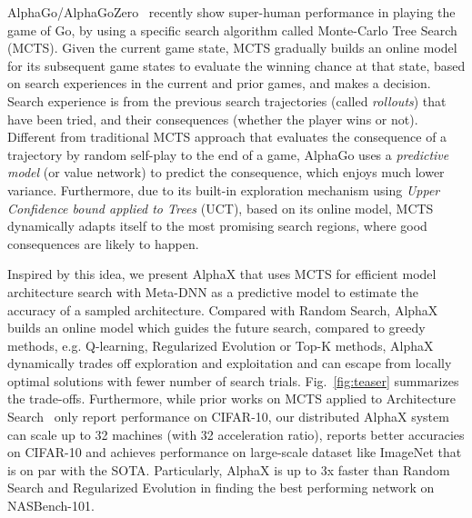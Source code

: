 \documentclass[10pt,twocolumn,letterpaper]{article}
\begin{document}
AlphaGo/AlphaGoZero~\cite{silver2016mastering} recently show super-human performance in playing the game of Go, by using a specific search algorithm called Monte-Carlo Tree Search (MCTS)\cite{kocsis2006bandit,browne2012survey}. Given the current game state, MCTS gradually builds an online model for its subsequent game states to evaluate the winning chance at that state, based on search experiences in the current and prior games, and makes a decision. Search experience is from the previous search trajectories (called \emph{rollouts}) that have been tried, and their consequences (whether the player wins or not). Different from traditional MCTS approach that evaluates the consequence of a trajectory by random self-play to the end of a game, AlphaGo uses a \emph{predictive model} (or value network) to predict the consequence, which enjoys much lower variance. Furthermore, due to its built-in exploration mechanism using \textit{Upper Confidence bound applied to Trees} (UCT)\cite{auer2002finite}, based on its online model, MCTS dynamically adapts itself to the most promising search regions, where good consequences are likely to happen.




Inspired by this idea, we present AlphaX that uses MCTS for efficient model architecture search with Meta-DNN as a predictive model to estimate the accuracy of a sampled architecture. Compared with Random Search, AlphaX builds an online model which guides the future search, compared to greedy methods, e.g. Q-learning, Regularized Evolution or Top-K methods, AlphaX dynamically trades off exploration and exploitation and can escape from locally optimal solutions with fewer number of search trials. Fig.~\ref{fig:teaser} summarizes the trade-offs. Furthermore, while prior works on MCTS applied to Architecture Search~\cite{wistuba2017finding, negrinho2017deeparchitect} only report performance on CIFAR-10, our distributed AlphaX system can scale up to 32 machines (with 32 acceleration ratio), reports better accuracies on CIFAR-10 and achieves performance on large-scale dataset like ImageNet that is on par with the SOTA. Particularly, AlphaX is up to 3x faster than Random Search and Regularized Evolution in finding the best performing network on NASBench-101.
\end{document}
